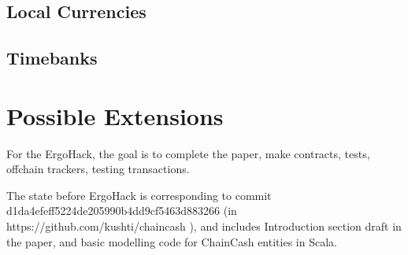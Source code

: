 \documentclass{article}   %
\newcommand{\cc}{ChainCash}
\begin{document}
\subsection{Local Currencies}

\subsection{Timebanks}

\section{Possible Extensions}


\newpage

 

\newpage
{}

For the ErgoHack, the goal is to complete the paper, make contracts, tests, offchain trackers, testing transactions.

The state before ErgoHack is corresponding to commit d1da4efeff5224de205990b4dd9cf5463d883266 (in https://github.com/kushti/chaincash ), and includes Introduction section draft in the paper, and basic modelling code for \cc{} entities in Scala.
\end{document}
